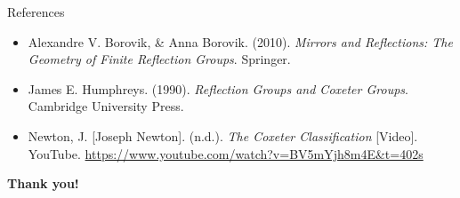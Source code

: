 \documentclass[aspectratio=169,xcolor=dvipsnames]{beamer}
\begin{document}
\begin{frame}{References}
\begin{itemize}
    \item Alexandre V. Borovik, \& Anna Borovik. (2010). \textit{Mirrors and Reflections: The Geometry of Finite Reflection Groups}. Springer.
    \item James E. Humphreys. (1990). \textit{Reflection Groups and Coxeter Groups}. Cambridge University Press.
    \item Newton, J. [Joseph Newton]. (n.d.). \textit{The Coxeter Classification} [Video]. YouTube. \url{https://www.youtube.com/watch?v=BV5mYjh8m4E&t=402s}
\end{itemize}

\end{frame}





\begin{frame}
    \Huge{\centerline{\textbf{Thank you!}}}
\end{frame}

\end{document}
